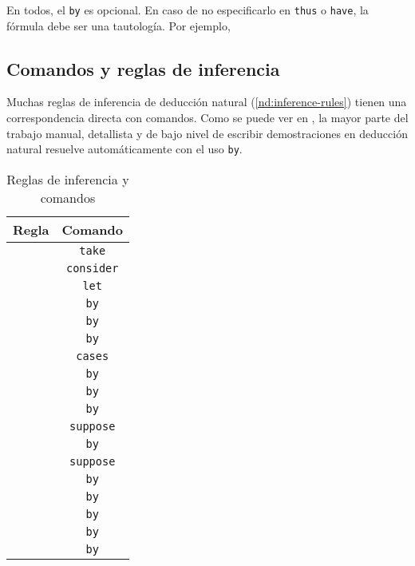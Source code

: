 En todos, el \lstinline{by} es opcional. En caso de no especificarlo en
\lstinline{thus} o \lstinline{have}, la fórmula debe ser una tautología. Por ejemplo,



\subsection{Comandos y reglas de inferencia}


Muchas reglas de inferencia de deducción natural (\ref{nd:inference-rules})
tienen una correspondencia directa con comandos. Como se puede ver en
, la mayor parte del trabajo
manual, detallista y de bajo nivel de escribir demostraciones en deducción
natural resuelve automáticamente con el uso \lstinline{by}.
\begin{table}[H]
    \centering
    \begin{tabular}{c|c}
    Regla & Comando \\
    \hline
        &   \lstinline|take| \\
        &   \lstinline|consider| \\
        &   \lstinline|let| \\
        &   \lstinline|by| \\
         &   \lstinline|by| \\
         &   \lstinline|by| \\
            &   \lstinline|cases| \\
           &   \lstinline|by| \\
        &   \lstinline|by| \\
        &   \lstinline|by| \\
           &   \lstinline|suppose| \\
           &   \lstinline|by| \\
           &   \lstinline|suppose| \\
           &   \lstinline|by| \\
          &   \lstinline|by| \\
         &   \lstinline|by| \\
            &   \lstinline|by| \\
             &   \lstinline|by|
    \end{tabular}
    \caption{Reglas de inferencia y comandos}
    \label{ppa:tab:inference-rules-to-commands}
\end{table}


